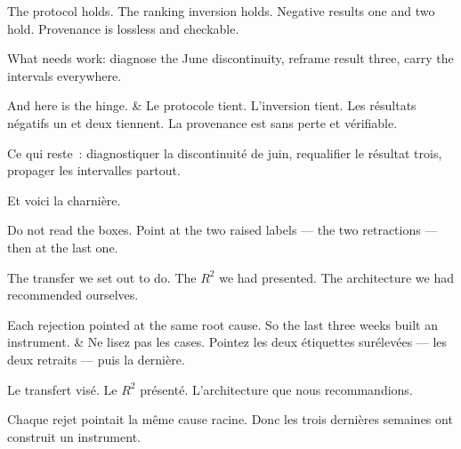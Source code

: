 \documentclass[10pt,a4paper]{article}
\begin{document}
\begin{say}
The protocol holds. The ranking inversion holds. Negative results one and two
hold. Provenance is lossless and checkable.

What needs work: diagnose the June discontinuity, reframe result three, carry the
intervals everywhere.

And here is the hinge. 
&
Le protocole tient. L'inversion tient. Les résultats négatifs un et deux tiennent.
La provenance est sans perte et vérifiable.

Ce qui reste~: diagnostiquer la discontinuité de juin, requalifier le résultat
trois, propager les intervalles partout.

Et voici la charnière. 
\end{say}

\clearpage

\begin{say}
Do not read the boxes. Point at the two raised labels --- the two retractions ---
then at the last one.

 The transfer we
set out to do. The $R^2$ we had presented. The architecture we had recommended
ourselves.

Each rejection pointed at the same root cause. So the last three weeks built an
instrument.
&
Ne lisez pas les cases. Pointez les deux étiquettes surélevées --- les deux
retraits --- puis la dernière.

 Le
transfert visé. Le $R^2$ présenté. L'architecture que nous recommandions.

Chaque rejet pointait la même cause racine. Donc les trois dernières semaines ont
construit un instrument.
\end{say}
\end{document}
